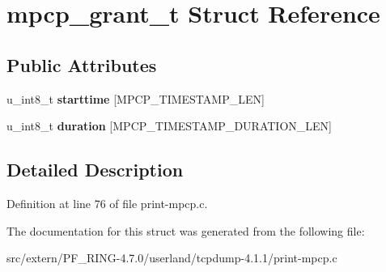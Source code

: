 \hypertarget{structmpcp__grant__t}{
\section{mpcp\_\-grant\_\-t Struct Reference}
\label{structmpcp__grant__t}
}
\subsection*{Public Attributes}
\begin{DoxyCompactItemize}
\item 
\hypertarget{structmpcp__grant__t_afc8f7462a04104f69d49e7e250b681ac}{
u\_\-int8\_\-t {\bfseries starttime} \mbox{[}MPCP\_\-TIMESTAMP\_\-LEN\mbox{]}}
\label{structmpcp__grant__t_afc8f7462a04104f69d49e7e250b681ac}

\item 
\hypertarget{structmpcp__grant__t_a97079cbfd0dc55f7a99123bac79a777d}{
u\_\-int8\_\-t {\bfseries duration} \mbox{[}MPCP\_\-TIMESTAMP\_\-DURATION\_\-LEN\mbox{]}}
\label{structmpcp__grant__t_a97079cbfd0dc55f7a99123bac79a777d}

\end{DoxyCompactItemize}


\subsection{Detailed Description}


Definition at line 76 of file print-\/mpcp.c.



The documentation for this struct was generated from the following file:\begin{DoxyCompactItemize}
\item 
src/extern/PF\_\-RING-\/4.7.0/userland/tcpdump-\/4.1.1/print-\/mpcp.c\end{DoxyCompactItemize}
